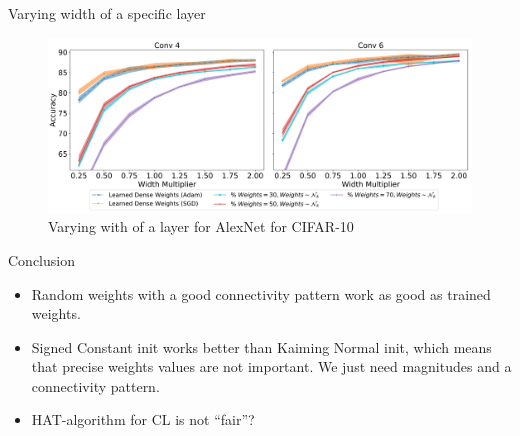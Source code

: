\documentclass[10pt]{beamer}
\begin{document}
\begin{frame}{Varying width of a specific layer}
    \begin{figure}
        \centering
        \includegraphics[width=\textwidth]{images/varying-width-alexnet}
        \caption{Varying with of a layer for AlexNet for CIFAR-10}
    \end{figure}
\end{frame}



%    

%    

\begin{frame}{Conclusion}
\begin{itemize}
    \item\pause Random weights with a good connectivity pattern work as good as trained weights.
    \item\pause Signed Constant init works better than Kaiming Normal init, which means that precise weights values are not important. We just need magnitudes and a connectivity pattern.
    \item\pause HAT-algorithm for CL is not ``fair''?
\end{itemize}
\end{frame}
\end{document}
